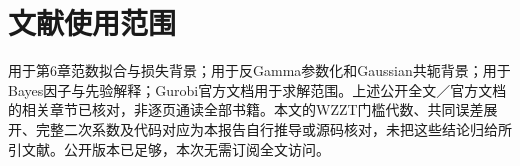 \documentclass[UTF8,11pt,a4paper,fontset=fandol]{ctexart}
\numberwithin{equation}{section}
\begin{document}
\section{文献使用范围}
\citet{boyd2004}用于第6章范数拟合与损失背景；\citet{murphy2007}用于反Gamma参数化和Gaussian共轭背景；\citet{KassRaftery1995}用于Bayes因子与先验解释；Gurobi官方文档用于求解范围。上述公开全文／官方文档的相关章节已核对，非逐页通读全部书籍。本文的WZZT门槛代数、共同误差展开、完整二次系数及代码对应为本报告自行推导或源码核对，未把这些结论归给所引文献。公开版本已足够，本次无需订阅全文访问。



\end{document}
